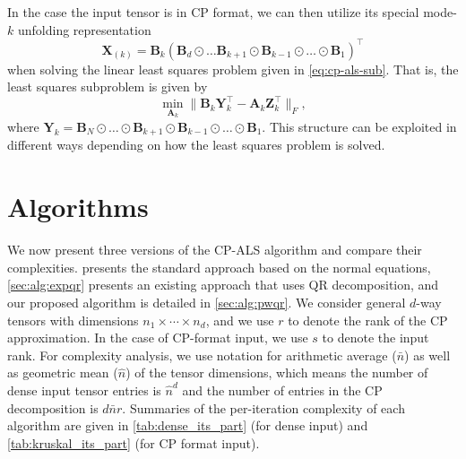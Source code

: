 \documentclass{article}
\newcommand{\mat}[1]{\mathbf{#1}}
\begin{document}
In the case the input tensor is in CP format, we can then utilize its special mode-$k$ unfolding representation 
$$\mat{X}_{(k)} = \mat{B}_k(\mat{B}_d \odot \dots \mat{B}_{k+1} \odot \mat{B}_{k-1} \odot \dots \odot \mat{B}_1)^\top$$
when solving the linear least squares problem given in \cref{eq:cp-als-sub}. 
That is, the least squares subproblem is given by 
\begin{equation}
\label{eq:cp-als-sub-ktensor}
\min_{\mat{A}_k}\|\mat{B}_{k}\mat{Y}_k^\top-\mat{A}_k\mat{Z}_k^\top\|_F,
\end{equation}
where $\mat{Y}_k = \mat{B}_N \odot \dots \odot \mat{B}_{k+1} \odot \mat{B}_{k-1} \odot \dots \odot \mat{B}_1$.
This structure can be exploited in different ways depending on how the least squares problem is solved.


\section{Algorithms} 
\label{sec:algo}

We now present three versions of the CP-ALS algorithm and compare their complexities.
 presents the standard approach based on the normal equations, \cref{sec:alg:expqr} presents an existing approach that uses QR decomposition, and our proposed algorithm is detailed in \cref{sec:alg:pwqr}.
We consider general $d$-way tensors with dimensions $n_1 \times \cdots \times n_d$, and we use $r$ to denote the rank of the CP approximation.
In the case of CP-format input, we use $s$ to denote the input rank.
For complexity analysis, we use notation for arithmetic average ($\bar n$) as well as geometric mean ($\hat n$) of the tensor dimensions, which means the number of dense input tensor entries is $\hat n^d$ and the number of entries in the CP decomposition is $d\bar n r$.
Summaries of the per-iteration complexity of each algorithm are given in \cref{tab:dense_its_part} (for dense input) and \cref{tab:kruskal_its_part} (for CP format input).
\end{document}
